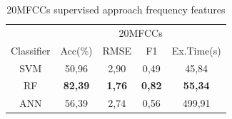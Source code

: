 \documentclass[conference]{IEEEtran}
\begin{document}
\begin{table}[!ht]
    \centering
    \caption{20MFCCs supervised approach frequency features}
    \label{tab:20MFCCs Frequency Features Table Results}
    \begin{tabular}{c c c c c}
    \toprule
    &\multicolumn{4}{c}{20MFCCs}\\
    \cmidrule{2-5}
        Classifier  &Acc(\%) &RMSE &F1 &Ex.Time(s)\\
    \midrule 
        SVM             &50,96 &2,90 &0,49  &45,84\\    
        RF              &\textbf{82,39}&\textbf{1,76}&\textbf{0,82}&\textbf{55,34}\\
        ANN             &56,39 &2,74 &0,56  &499,91\\
    \bottomrule
    \end{tabular}
\end{table}
\end{document}
